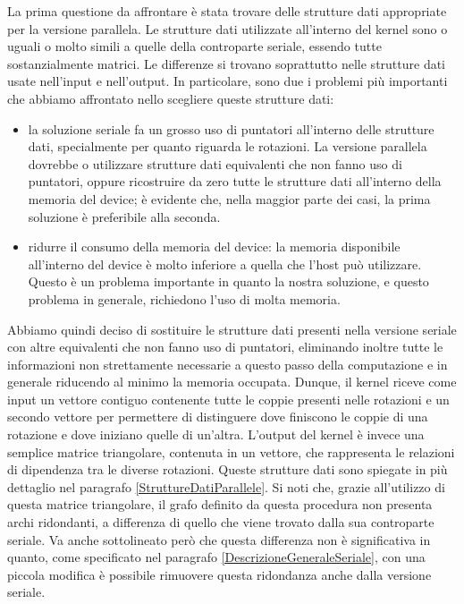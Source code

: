 \documentclass[12pt]{article}
\begin{document}
    La prima questione da affrontare è stata trovare delle strutture dati appropriate per la versione parallela. Le strutture dati utilizzate all'interno del kernel sono o uguali o molto simili a quelle della controparte seriale, essendo tutte sostanzialmente matrici. Le differenze si trovano soprattutto nelle strutture dati usate nell'input e nell'output. In particolare, sono due i problemi più importanti che abbiamo affrontato nello scegliere queste strutture dati:
    \begin{itemize}
        \item la soluzione seriale fa un grosso uso di puntatori all'interno delle strutture dati, specialmente per quanto riguarda le rotazioni. La versione parallela dovrebbe o utilizzare strutture dati equivalenti che non fanno uso di puntatori, oppure ricostruire da zero tutte le strutture dati all'interno della memoria del device; è evidente che, nella maggior parte dei casi, la prima soluzione è preferibile alla seconda.
        \item ridurre il consumo della memoria del device: la memoria disponibile all'interno del device è molto inferiore a quella che l'host può utilizzare. Questo è un problema importante in quanto la nostra soluzione, e questo problema in generale, richiedono l'uso di molta memoria.
    \end{itemize}
    Abbiamo quindi deciso di sostituire le strutture dati presenti nella versione seriale con altre equivalenti che non fanno uso di puntatori, eliminando inoltre tutte le informazioni non strettamente necessarie a questo passo della computazione e in generale riducendo al minimo la memoria occupata. Dunque, il kernel riceve come input un vettore contiguo contenente tutte le coppie presenti nelle rotazioni e un secondo vettore per permettere di distinguere dove finiscono le coppie di una rotazione e dove iniziano quelle di un'altra. L'output del kernel è invece una semplice matrice triangolare, contenuta in un vettore, che rappresenta le relazioni di dipendenza tra le diverse rotazioni. Queste strutture dati sono spiegate in più dettaglio nel paragrafo \ref{StruttureDatiParallele}. Si noti che, grazie all'utilizzo di questa matrice triangolare, il grafo definito da questa procedura non presenta archi ridondanti, a differenza di quello che viene trovato dalla sua controparte seriale. Va anche sottolineato però che questa differenza non è significativa in quanto, come specificato nel paragrafo \ref{DescrizioneGeneraleSeriale}, con una piccola modifica è possibile rimuovere questa ridondanza anche dalla versione seriale.
\end{document}
